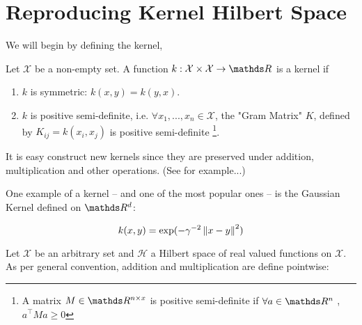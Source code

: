 

\section{Reproducing Kernel Hilbert Space}

We will begin by defining the kernel,

\begin{definition}
    Let $\mathcal{X}$ be a non-empty set. A function 
    $k: \mathcal{X} \times \mathcal{X} \rightarrow \R$ is a kernel if 
    \begin{enumerate}
        \item $k$ is symmetric: $k(x, y) = k(y, x)$.
        \item $k$ is positive semi-definite, i.e. $\forall x_1, ..., x_n \in \mathcal{X}$,
        the "Gram Matrix" $K$, defined by $K_{ij} = k(x_i, x_j)$ is positive semi-definite
        \footnote{A matrix $M \in \R^{n\times x}$ is positive semi-definite if $\forall a \in \R^n$
        , $a^\intercal Ma \geq 0$}.
    \end{enumerate}
\end{definition}

It is easy construct new kernels since they are preserved under addition, multiplication and other operations. 
(See for example...)

One example of a kernel -- and one of the most popular ones -- is the Gaussian Kernel defined on $\R^d$:

$$
    k(x, y) = \exp (-\gamma^{-2}\left\lVert x - y\right\rVert^2)
$$

Let $\mathcal{X}$ be an arbitrary set and $\mathcal{H}$ a Hilbert space of real valued functions
on $\mathcal{X}$. As per general convention, addition and multiplication are define pointwise:

